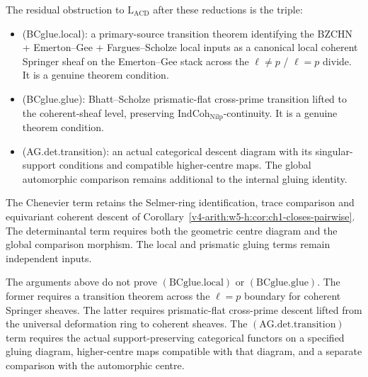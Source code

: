 \begin{remark}
\label{v4-arith:w5-h:rem:genuine-core-residual}
The residual obstruction to \(\mathrm{L}_{\mathrm{ACD}}\) after these
reductions is the triple:
\begin{itemize}
\item (BCglue.local): a primary-source transition theorem identifying
the BZCHN + Emerton--Gee + Fargues--Scholze local inputs as a
canonical local coherent Springer sheaf on the Emerton--Gee stack
across the \(\ell\neq p\) / \(\ell=p\) divide. It is a genuine
theorem condition.
\item (BCglue.glue): Bhatt--Scholze prismatic-flat cross-prime
transition lifted to the coherent-sheaf level, preserving
\(\mathrm{IndCoh}_{\mathrm{Nilp}}\)-continuity. It is a genuine
theorem condition.
\item (AG.det.transition): an actual categorical descent diagram
with its singular-support conditions and compatible higher-centre
maps. The global automorphic comparison remains additional to the
internal gluing identity.
\end{itemize}
The Chenevier term retains the Selmer-ring identification, trace
comparison and equivariant coherent descent of
Corollary~\ref{v4-arith:w5-h:cor:ch1-closes-pairwise}. The
determinantal term requires both the geometric centre diagram
and the global comparison morphism.
The local and prismatic gluing terms remain independent inputs.
\end{remark}

\begin{remark}
\label{v4-arith:w5-h:rem:what-wave5-cannot-touch}
The arguments above do not prove \((\mathrm{BCglue.local})\) or
\((\mathrm{BCglue.glue})\). The former requires a transition theorem
across the \(\ell=p\) boundary for coherent Springer sheaves. The
latter requires prismatic-flat cross-prime descent lifted from the
universal deformation ring to coherent sheaves. The
\((\mathrm{AG.det.transition})\) term requires the
actual support-preserving categorical functors on a specified gluing
diagram, higher-centre maps compatible with that diagram, and a
separate comparison with the automorphic centre.
\end{remark}

